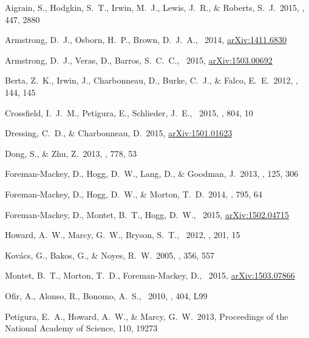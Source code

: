 \documentclass[12pt,preprint]{aastex}
\begin{document}
\clearpage
\newcommand{\arxiv}[1]{{\href{http://arxiv.org/abs/#1}{arXiv:{#1}}}}
\begin{thebibliography}{}\raggedright%
\setlength{\itemsep}{0ex}%
\setlength{\parskip}{0ex}%
Aigrain, S., Hodgkin, S.~T., Irwin, M.~J., Lewis, J.~R., \& Roberts, S.~J.\
2015, \mnras, 447, 2880

Armstrong, D.~J., Osborn, H.~P., Brown, D.~J.~A., \etal\ 2014,
\arxiv{1411.6830}

Armstrong, D.~J., Veras, D., Barros, S.~C.~C., \etal\ 2015, \arxiv{1503.00692}

Berta, Z.~K., Irwin, J., Charbonneau, D., Burke, C.~J., \& Falco, E.~E.\ 2012,
\aj, 144, 145

Crossfield, I.~J.~M., Petigura, E., Schlieder, J.~E., \etal\ 2015, \apj, 804,
10

Dressing, C.~D., \& Charbonneau, D.\ 2015, \arxiv{1501.01623}

Dong, S., \& Zhu, Z.\ 2013, \apj, 778, 53

 Foreman-Mackey,
D., Hogg, D.~W., Lang, D., \& Goodman, J.\ 2013, \pasp, 125, 306

Foreman-Mackey, D., Hogg, D.~W., \& Morton, T.~D.\ 2014, \apj, 795, 64

Foreman-Mackey, D., Montet, B.~T., Hogg, D.~W., \etal\ 2015, \arxiv{1502.04715}

Howard, A.~W., Marcy, G.~W., Bryson, S.~T., \etal\ 2012, \apjs, 201, 15

Kov{\'a}cs, G., Bakos, G., \& Noyes, R.~W.\ 2005, \mnras, 356, 557

Montet, B.~T., Morton, T.~D., Foreman-Mackey, D., \etal\ 2015,
\arxiv{1503.07866}

Ofir, A., Alonso, R., Bonomo, A.~S., \etal\ 2010, \mnras, 404, L99

Petigura, E.~A., Howard, A.~W., \& Marcy, G.~W.\ 2013,
Proceedings of the National Academy of Science, 110, 19273


\end{thebibliography}
\end{document}
